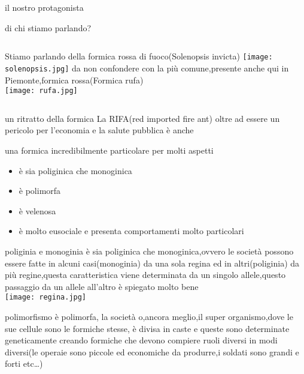 \documentclass{beamer}
\begin{document}
\begin{section}{il nostro protagonista}
\begin{frame}{di chi stiamo parlando?}
\begin{columns}
    \centering
    Stiamo parlando della formica rossa di fuoco(\alert{Solenopsis invicta})
    \texttt{[image: solenopsis.jpg]}
    \centering 
    da non confondere con la più comune,presente anche qui in Piemonte,formica rossa(\alert{Formica rufa}) \\
    \texttt{[image: rufa.jpg]}
\end{columns}
\end{frame}
\begin{frame}{un ritratto della formica}
La RIFA(red imported fire ant) oltre ad essere un pericolo per l'economia e la salute pubblica è anche 
\begin{block}{una formica}
incredibilmente particolare per molti aspetti
\end{block}
\begin{itemize}[label=]
\item è sia poliginica che monoginica
\item è polimorfa
\item è velenosa
\item è molto eusociale e presenta comportamenti molto particolari
\end{itemize}
\end{frame}
\begin{frame}{poliginia e monoginia}
    è sia poliginica che monoginica,ovvero le società possono essere fatte in alcuni casi(monoginia) da \alert{una sola regina} ed in altri(poliginia) da \alert{più regine},questa caratteristica viene determinata da un singolo allele,questo passaggio da un allele all'altro è spiegato molto bene  \\
    \texttt{[image: regina.jpg]}

\end{frame}
\begin{frame}{polimorfismo}
 è polimorfa, la società o,ancora meglio,il super organismo,dove le sue cellule sono le formiche stesse, è divisa in caste e queste sono determinate geneticamente creando formiche che devono compiere ruoli diversi in modi diversi(le operaie sono piccole ed economiche da produrre,i soldati sono grandi e forti etc…) 


\end{frame}
\end{section}
\end{document}
